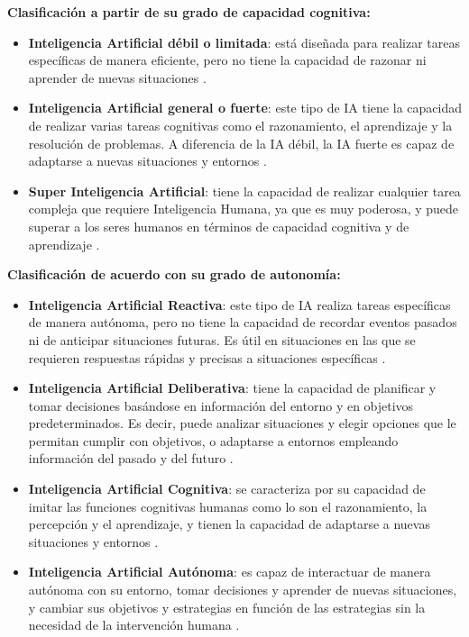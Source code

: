 \textbf{Clasificación a partir de su grado de capacidad cognitiva:}
\begin{itemize}
    \item \textbf{Inteligencia Artificial débil o limitada}: está diseñada para realizar tareas específicas de manera eficiente, pero no tiene la capacidad de razonar ni aprender de nuevas situaciones \cite{ref42}.\\
    \item \textbf{Inteligencia Artificial general o fuerte}: este tipo de IA tiene la capacidad de realizar varias tareas cognitivas como el razonamiento, el aprendizaje y la resolución de problemas. A diferencia de la IA débil, la IA fuerte es capaz de adaptarse a nuevas situaciones y entornos \cite{ref42}.\\
    \item \textbf{Super Inteligencia Artificial}: tiene la capacidad de realizar cualquier tarea compleja que requiere Inteligencia Humana, ya que es muy poderosa, y puede superar a los seres humanos en términos de capacidad cognitiva y de aprendizaje \cite{ref42}.\\
\end{itemize}

\textbf{Clasificación de acuerdo con su grado de autonomía:}

\begin{itemize}
    \item \textbf{Inteligencia Artificial Reactiva}: este tipo de IA realiza tareas específicas de manera autónoma, pero no tiene la capacidad de recordar eventos pasados ni de anticipar situaciones futuras. Es útil en situaciones en las que se requieren respuestas rápidas y precisas a situaciones específicas \cite{ref42}.\\
    \item \textbf{Inteligencia Artificial Deliberativa}: tiene la capacidad de planificar y tomar decisiones basándose en información del entorno y en objetivos predeterminados. Es decir, puede analizar situaciones y elegir opciones que le permitan cumplir con objetivos, o adaptarse a entornos empleando información del pasado y del futuro \cite{ref42}.\\
    \item \textbf{Inteligencia Artificial Cognitiva}: se caracteriza por su capacidad de imitar las funciones cognitivas humanas como lo son el razonamiento, la percepción y el aprendizaje, y tienen la capacidad de adaptarse a nuevas situaciones y entornos \cite{ref42}.\\
    \item \textbf{Inteligencia Artificial Autónoma}: es capaz de interactuar de manera autónoma con su entorno, tomar decisiones y aprender de nuevas situaciones, y cambiar sus objetivos y estrategias en función de las estrategias sin la necesidad de la intervención humana \cite{ref42}.
\end{itemize}


